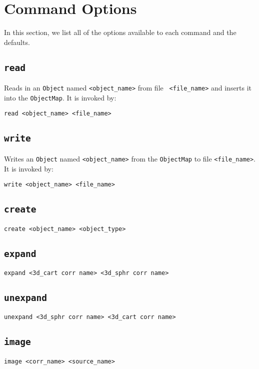\section{Command Options}
In this section, we list all of the options available to each command and the
defaults.

\subsection{{\tt read}}
Reads in an {\tt Object} named {\tt <object\_name>} from file {\tt
<file\_name>} and inserts it into the {\tt ObjectMap}.  It is invoked by:
\begin{verbatim}
read <object_name> <file_name>
\end{verbatim}

\subsection{{\tt write}}
Writes an {\tt Object} named {\tt <object\_name>} from the {\tt ObjectMap} to 
file {\tt <file\_name>}.  It is invoked by:
\begin{verbatim}
write <object_name> <file_name>
\end{verbatim}

\subsection{{\tt create}}
\begin{verbatim}
create <object_name> <object_type>
\end{verbatim}

\subsection{{\tt expand}}
\begin{verbatim}
expand <3d_cart corr name> <3d_sphr corr name>
\end{verbatim}

\subsection{{\tt unexpand}}
\begin{verbatim}
unexpand <3d_sphr corr name> <3d_cart corr name>
\end{verbatim}

\subsection{{\tt image}}
\begin{verbatim}
image <corr_name> <source_name>
\end{verbatim}

